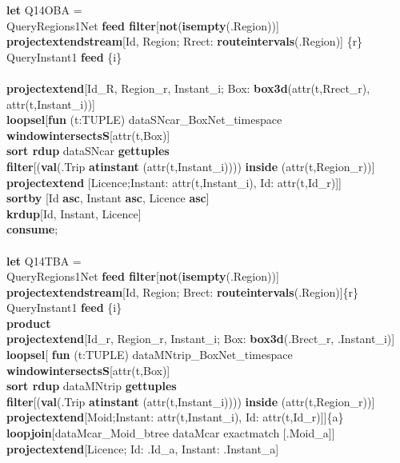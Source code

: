 \documentclass[a4paper]{article}
\newcommand{\op}[1]{\textbf{#1}}
\begin{document}
\begin{scriptsize}
\begin{tabbing}
\op{let} Q14OBA =\\
\>QueryRegions1Net \op{feed filter}[\op{not}(\op{isempty}(.Region))]\\
\>\op{projectextendstream}[Id, Region; Rrect:  \op{routeintervals}(.Region)]
\{r\}\\
\>QueryInstant1 \op{feed} \{i\}\\
\\
\>\op{projectextend}[Id\_R, Region\_r, Instant\_i; Box:
\op{box3d}(attr(t,Rrect\_r), attr(t,Instant\_i))]\\
\>\op{loopsel}[\op{fun} (t:TUPLE) dataSNcar\_BoxNet\_timespace
\op{windowintersectsS}[attr(t,Box)]\\
\>\>\op{sort rdup} dataSNcar \op{gettuples}\\
\>\>\op{filter}[(\op{val}(.Trip \op{atinstant} (attr(t,Instant\_i))))
\op{inside} (attr(t,Region\_r))]\\
\>\>\op{projectextend} [Licence;Instant: attr(t,Instant\_i), Id:
attr(t,Id\_r)]]\\
\>\op{sortby} [Id \op{asc}, Instant \op{asc}, Licence \op{asc}]\\
\>\op{krdup}[Id, Instant, Licence]\\
\op{consume};\\
\\
\op{let} Q14TBA =\\
\>QueryRegions1Net \op{feed filter}[\op{not}(\op{isempty}(.Region))]\\
\>\>\op{projectextendstream}[Id, Region; Brect:
\op{routeintervals}(.Region)]\{r\}\\
\>QueryInstant1 \op{feed} \{i\}\\
\>\op{product}\\
\>\op{projectextend}[Id\_r, Region\_r, Instant\_i; Box: \op{box3d}(.Brect\_r,
.Instant\_i)]\\
\>\op{loopsel}[ \op{fun} (t:TUPLE) dataMNtrip\_BoxNet\_timespace
\op{windowintersectsS}[attr(t,Box)]\\
\>\>\op{sort rdup} dataMNtrip \op{gettuples}\\
\>\>\op{filter}[(\op{val}(.Trip \op{atinstant} (attr(t,Instant\_i))))
\op{inside} (attr(t,Region\_r))]\\
\>\>\op{projectextend}[Moid;Instant: attr(t,Instant\_i), Id:
attr(t,Id\_r)]]\{a\}\\
\>\op{loopjoin}[dataMcar\_Moid\_btree dataMcar exactmatch [.Moid\_a]]\\
\>\op{projectextend}[Licence; Id: .Id\_a, Instant: .Instant\_a]\\

\end{tabbing}
\end{scriptsize}
\end{document}
